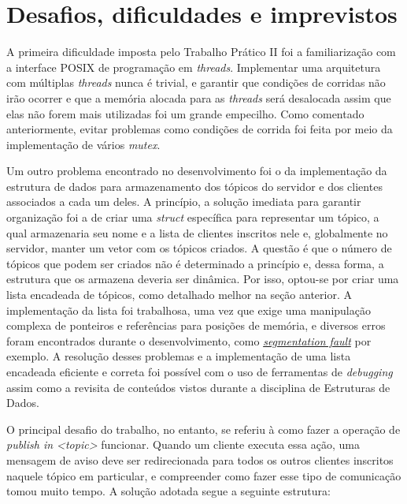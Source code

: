 \documentclass{article}
\begin{document}
\section{Desafios, dificuldades e imprevistos}

A primeira dificuldade imposta pelo Trabalho Prático II foi a familiarização
com a
interface POSIX de programação em \textit{threads}. Implementar uma arquitetura
com múltiplas \textit{threads}
nunca é trivial, e garantir que condições de corridas não irão ocorrer e que a
memória alocada para as \textit{threads} será desalocada assim que elas não
forem mais utilizadas foi um grande empecilho. Como comentado anteriormente,
evitar problemas como condições de corrida foi feita por meio da implementação
de vários \textit{mutex}.

Um outro problema encontrado no desenvolvimento foi o da implementação da
estrutura de dados para armazenamento dos tópicos do servidor e dos clientes
associados a cada um deles. A princípio, a solução imediata para garantir
organização foi a de criar uma \textit{struct} específica para representar um
tópico, a qual armazenaria seu nome e a lista de clientes inscritos nele e,
globalmente no servidor, manter um vetor com os tópicos criados. A questão é
que o número de tópicos que podem ser criados não é determinado a princípio e,
dessa forma, a estrutura que os armazena deveria ser dinâmica. Por isso,
optou-se por criar uma lista encadeada de tópicos, como detalhado melhor na
seção anterior. A implementação
da lista foi trabalhosa, uma vez que exige uma manipulação complexa de
ponteiros e referências para posições de memória, e diversos erros foram
encontrados durante o desenvolvimento, como
\href{https://en.wikipedia.org/wiki/Segmentation_fault}{\textit{segmentation
            fault}} por exemplo. A resolução desses problemas e a implementação
de uma lista encadeada eficiente e correta foi possível com o uso de
ferramentas de \textit{debugging} assim como a revisita de conteúdos vistos
durante a disciplina de Estruturas de Dados.

O principal desafio do trabalho, no entanto, se referiu à como fazer a operação
de \textit{publish in <topic>} funcionar. Quando um cliente executa essa ação,
uma mensagem de aviso deve ser redirecionada para todos os outros
clientes inscritos naquele tópico em particular, e compreender como fazer esse
tipo de comunicação tomou muito tempo. A solução adotada segue a seguinte
estrutura:
\end{document}
